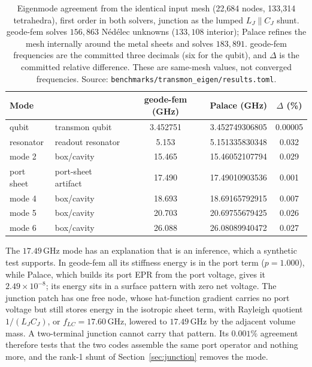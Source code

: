 \documentclass{anvil-paper}
\begin{document}
\begin{table}[htbp]
  \centering
  \caption{Eigenmode agreement from the identical input mesh (22{,}684
  nodes, 133{,}314 tetrahedra), first order in both solvers, junction as
  the lumped $L_J \parallel C_J$ shunt. geode-fem solves $156{,}863$
  N\'ed\'elec unknowns ($133{,}108$ interior); Palace refines the mesh
  internally around the metal sheets and solves $183{,}891$. geode-fem
  frequencies are the committed three decimals (six for the qubit), and
  $\Delta$ is the committed relative difference. These are same-mesh
  values, not converged frequencies. Source:
  \texttt{benchmarks/transmon\_eigen/results.toml}.}
  \label{tab:agreement}
  \small
  \begin{tabular}{@{}llccc@{}}
    \toprule
    Mode & & geode-fem (GHz) & Palace (GHz) & $\Delta$ (\%) \\
    \midrule
    qubit & transmon qubit & 3.452751 & 3.452749306805 & 0.00005 \\
    resonator & readout resonator & 5.153 & 5.151335830348 & 0.032 \\
    mode 2 & box/cavity & 15.465 & 15.46052107794 & 0.029 \\
    port sheet & port-sheet artifact & 17.490 & 17.49010903536 & 0.001 \\
    mode 4 & box/cavity & 18.693 & 18.69165792915 & 0.007 \\
    mode 5 & box/cavity & 20.703 & 20.69755679425 & 0.026 \\
    mode 6 & box/cavity & 26.088 & 26.08089940472 & 0.027 \\
    \bottomrule
  \end{tabular}
\end{table}

The $17.49$\,GHz mode has an explanation that is an inference, which a
synthetic test supports. In geode-fem all its stiffness energy is
in the port term ($p = 1.000$), while Palace, which builds its port EPR
from the port voltage, gives it $2.49\times10^{-8}$; its energy sits in a
surface pattern with zero net voltage. The junction patch has one free
node, whose hat-function gradient carries no port voltage but still
stores energy in the isotropic sheet term, with Rayleigh quotient
$1/(L_JC_J)$, or $f_{LC} = 17.60$\,GHz, lowered to $17.49$\,GHz by the
adjacent volume mass. A two-terminal junction cannot carry that pattern.
Its $0.001\%$ agreement therefore tests that the two codes assemble the
same port operator and nothing more, and the rank-1 shunt of
Section~\ref{sec:junction} removes the mode.
\end{document}
